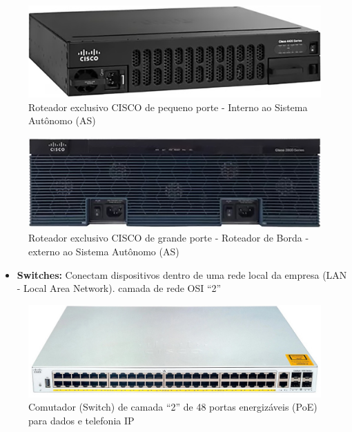 \documentclass[
]{book}
\providecommand{\tightlist}{%
  \setlength{\itemsep}{0pt}\setlength{\parskip}{0pt}}
\begin{document}
\begin{figure}
\centering
\includegraphics{images/InfraEstrutura/Redes/roteador-cisco.jpg}
\caption{Roteador exclusivo CISCO de pequeno porte - Interno ao Sistema Autônomo (AS)}
\end{figure}

\begin{figure}
\centering
\includegraphics{images/InfraEstrutura/Redes/roteador-cisco-3900.jpg}
\caption{Roteador exclusivo CISCO de grande porte - Roteador de Borda - externo ao Sistema Autônomo (AS)}
\end{figure}

\begin{itemize}
\tightlist
\item
  \textbf{Switches:} Conectam dispositivos dentro de uma rede local da empresa (LAN - Local Area Network). camada de rede OSI ``2''
\end{itemize}

\begin{figure}
\centering
\includegraphics{images/InfraEstrutura/Redes/switch-cisco-3750x-48.jpg}
\caption{Comutador (Switch) de camada ``2'' de 48 portas energizáveis (PoE) para dados e telefonia IP}
\end{figure}
\end{document}
